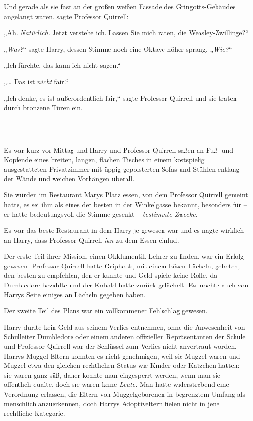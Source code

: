 {Und gerade als sie fast an der großen weißen Fassade des Gringotts-Gebäudes angelangt waren, sagte Professor Quirrell:

„Ah. \emph{Natürlich.} Jetzt verstehe ich. Lassen Sie mich raten, die Weasley-Zwillinge?“

„\emph{Was?}“ sagte Harry, dessen Stimme noch eine Oktave höher sprang. „\emph{Wie?}“

„Ich fürchte, das kann ich nicht sagen.“

„… Das ist \emph{nicht} fair.“

„Ich denke, es ist außerordentlich fair,“ sagte Professor Quirrell und sie traten durch bronzene Türen ein.

--------------------------------------------------------------------------------------------------------------------------------------------

Es war kurz vor Mittag und Harry und Professor Quirrell saßen an Fuß- und Kopfende eines breiten, langen, flachen Tisches in einem kostspielig ausgestatteten Privatzimmer mit üppig gepolsterten Sofas und Stühlen entlang der Wände und weichen Vorhängen überall.

Sie würden im Restaurant Marys Platz essen, von dem Professor Quirrell gemeint hatte, es sei ihm als eines der besten in der Winkelgasse bekannt, besonders für -- er hatte bedeutungsvoll die Stimme gesenkt -- \emph{bestimmte Zwecke.}

Es war das beste Restaurant in dem Harry je gewesen war und es nagte wirklich an Harry, dass Professor Quirrell \emph{ihn} zu dem Essen einlud.

Der erste Teil ihrer Mission, einen Okklumentik-Lehrer zu finden, war ein Erfolg gewesen. Professor Quirrell hatte Griphook, mit einem bösen Lächeln, gebeten, den besten zu empfehlen, den er kannte und Geld spiele keine Rolle, da Dumbledore bezahlte und der Kobold hatte zurück gelächelt. Es mochte auch von Harrys Seite einiges an Lächeln gegeben haben.

Der zweite Teil des Plans war ein vollkommener Fehlschlag gewesen.

Harry durfte kein Geld aus seinem Verlies entnehmen, ohne die Anwesenheit von Schulleiter Dumbledore oder einem anderen offiziellen Repräsentanten der Schule und Professor Quirrell war der Schlüssel zum Verlies nicht anvertraut worden. Harrys Muggel-Eltern konnten es nicht genehmigen, weil sie Muggel waren und Muggel etwa den gleichen rechtlichen Status wie Kinder oder Kätzchen hatten: sie waren ganz süß, daher konnte man eingesperrt werden, wenn man sie öffentlich quälte, doch sie waren keine \emph{Leute.} Man hatte widerstrebend eine Verordnung erlassen, die Eltern von Muggelgeborenen in begrenztem Umfang als menschlich anzuerkennen, doch Harrys Adoptiveltern fielen nicht in jene rechtliche Kategorie.

}

